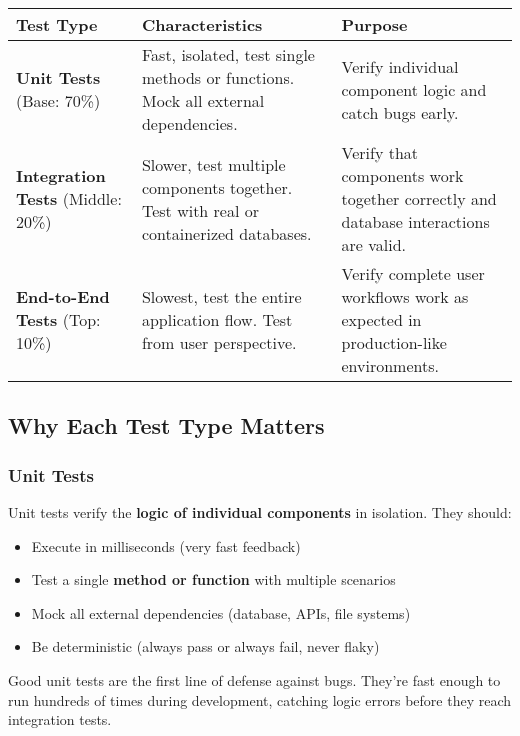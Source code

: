 \documentclass[12pt,a4paper]{article}
\begin{document}
\begin{center}
\begin{tabularx}{0.8\textwidth}{|l|X|X|}
\toprule
\textbf{Test Type} & \textbf{Characteristics} & \textbf{Purpose} \\
\midrule
\textbf{Unit Tests} (Base: 70\%) &
Fast, isolated, test single methods or functions. Mock all external dependencies. &
Verify individual component logic and catch bugs early. \\
\midrule
\textbf{Integration Tests} (Middle: 20\%) &
Slower, test multiple components together. Test with real or containerized databases. &
Verify that components work together correctly and database interactions are valid. \\
\midrule
\textbf{End-to-End Tests} (Top: 10\%) &
Slowest, test the entire application flow. Test from user perspective. &
Verify complete user workflows work as expected in production-like environments. \\
\bottomrule
\end{tabularx}
\end{center}

\subsection{Why Each Test Type Matters}

\subsubsection{Unit Tests}

Unit tests verify the \textbf{logic of individual components} in isolation. They should:

\begin{itemize}
    \item Execute in milliseconds (very fast feedback)
    \item Test a single \textbf{method or function} with multiple scenarios
    \item Mock all external dependencies (database, APIs, file systems)
    \item Be deterministic (always pass or always fail, never flaky)
\end{itemize}

\begin{tipbox}
Good unit tests are the first line of defense against bugs. They're fast enough to run hundreds of times during development, catching logic errors before they reach integration tests.
\end{tipbox}
\end{document}
